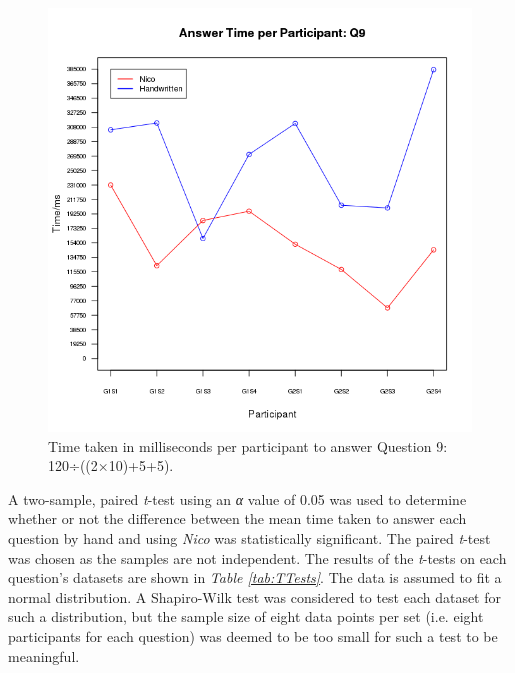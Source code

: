 \documentclass[12pt,twoside,notitlepage,xetex]{report}
\begin{document}
{\begin{center}
\begin{figure}[H]
\begin{center}
\includegraphics[width=\textwidth-2cm]{figs/graphs/q9.png}
\end{center}
\caption{Time taken in milliseconds per participant to answer Question 9: 120÷((2×10)+5+5).}
\label{fig:PlotQ9}
\end{figure}
\end{center}

A two-sample, paired \emph{t}-test using an \emph{α} value of 0.05 was used to determine whether or not the difference between the mean time taken to answer each question by hand and using \emph{Nico} was statistically significant.  The paired \emph{t}-test was chosen as the samples are not independent.  The results of the \emph{t}-tests on each question's datasets are shown in \emph{Table \ref{tab:TTests}}.  The data is assumed to fit a normal distribution.  A Shapiro-Wilk test was considered to test each dataset for such a distribution, but the sample size of eight data points per set (i.e. eight participants for each question) was deemed to be too small for such a test to be meaningful.

}
\end{document}
